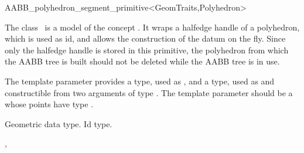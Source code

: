 \ccRefPageBegin


\begin{ccRefClass}{AABB_polyhedron_segment_primitive<GeomTraits,Polyhedron>}


\ccDefinition
  
The class \ccRefName\ is a model of the concept . It wraps a halfedge handle of a polyhedron, which is used as id, and allows the construction of the datum on the fly. Since only the halfedge handle is stored in this primitive, the polyhedron from which the AABB tree is built should not be deleted while the AABB tree is in use.

\ccParameters
The template parameter  provides a  type, used as , and a  type, used as  and constructible from two arguments of type . The template parameter  should be a  whose points have type .


\ccTypes

          {Geometric data type.}
\ccGlue
{}
          {Id type.}

\ccSeeAlso

,\\
\\

\end{ccRefClass}

\ccRefPageEnd

